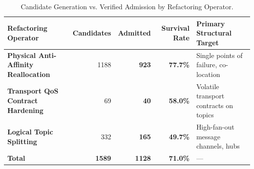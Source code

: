 \begin{table}[htbp]
\centering
\footnotesize
\setlength{\tabcolsep}{3.5pt}
\caption{Candidate Generation vs. Verified Admission by Refactoring Operator.}
\label{tab:operator_results}
\begin{tabularx}{\textwidth}{lrrr>{\raggedright\arraybackslash}X}
\toprule
\textbf{Refactoring Operator} & \textbf{Candidates} & \textbf{Admitted} & \textbf{Survival Rate} & \textbf{Primary Structural Target} \\
\midrule
\textbf{Physical Anti-Affinity Reallocation} & 1188 & \textbf{923} & \textbf{77.7\%} & Single points of failure, co-location \\
\textbf{Transport QoS Contract Hardening} & 69 & \textbf{40} & \textbf{58.0\%} & Volatile transport contracts on topics \\
\textbf{Logical Topic Splitting} & 332 & \textbf{165} & \textbf{49.7\%} & High-fan-out message channels, hubs \\
\midrule
\textbf{Total} & \textbf{1589} & \textbf{1128} & \textbf{71.0\%} & --- \\
\bottomrule
\end{tabularx}
\end{table}

